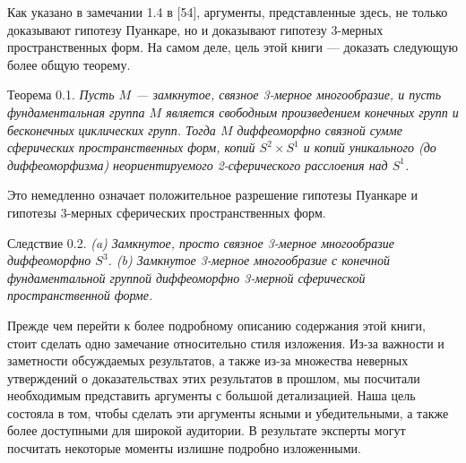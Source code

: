 Как указано в замечании 1.4 в [54], аргументы, представленные здесь, не только 
доказывают гипотезу Пуанкаре, но и доказывают гипотезу 3-мерных пространственных 
форм. На самом деле, цель этой книги — доказать следующую более общую теорему.\vspace{0.5em}

Теорема 0.1. \textit{Пусть $M$ — замкнутое, связное 3-мерное многообразие, 
и пусть фундаментальная группа $M$ является свободным произведением конечных 
групп и бесконечных циклических групп. Тогда $M$ диффеоморфно связной сумме 
сферических пространственных форм, копий $S^{2}\times S^{1}$ и копий 
уникального (до диффеоморфизма) неориентируемого 2-сферического расслоения над 
$S^{1}$.}\vspace{0.5em}

Это немедленно означает положительное разрешение гипотезы Пуанкаре и гипотезы 
3-мерных сферических пространственных форм.\vspace{0.5em}

Следствие 0.2.\textit{
(a) Замкнутое, просто связное 3-мерное многообразие диффеоморфно $S^{3}$.
(b) Замкнутое 3-мерное многообразие с конечной фундаментальной группой диффеоморфно 
3-мерной сферической пространственной форме.}\vspace{0.5em}

Прежде чем перейти к более подробному описанию содержания этой книги, стоит 
сделать одно замечание относительно стиля изложения. Из-за важности и 
заметности обсуждаемых результатов, а также из-за множества неверных утверждений 
о доказательствах этих результатов в прошлом, мы посчитали необходимым 
представить аргументы с большой детализацией. Наша цель состояла в том, чтобы 
сделать эти аргументы ясными и убедительными, а также более доступными для 
широкой аудитории. В результате эксперты могут посчитать некоторые моменты 
излишне подробно изложенными.











